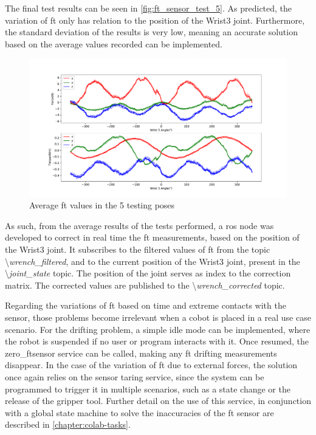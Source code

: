 \par The final test results can be seen in \autoref{fig:ft_sensor_test_5}. As predicted, the variation of \ac{ft} only has relation to the position of the Wrist3 joint. Furthermore, the standard deviation of the results is very low, meaning an accurate solution based on the average values recorded can be implemented.

\begin{figure}[h]
    \centering
    \includegraphics[width=\linewidth]{figs/chp3/ft_sensor_test_5.pdf}
    \caption{Average \ac{ft} values in the 5 testing poses}
    \label{fig:ft_sensor_test_5}
\end{figure}


\par As such, from the average results of the tests performed, a \ac{ros} node was developed to correct in real time the \ac{ft} measurements, based on the position of the Wrist3 joint. It subscribes to the filtered values of \ac{ft} from the topic \textbackslash \textit{wrench\_filtered}, and to the current position of the Wrist3 joint, present in the \textbackslash \textit{joint\_state} topic. The position of the joint serves as index to the correction matrix. The corrected values are published to the \textbackslash \textit{wrench\_corrected} topic.

\par Regarding the variations of \ac{ft} based on time and extreme contacts with the sensor, those problems become irrelevant when a cobot is placed in a real use case scenario. For the drifting problem, a simple idle mode can be implemented, where the robot is suspended if no user or program interacts with it. Once resumed, the zero\_ftsensor service can be called, making any \ac{ft} drifting measurements disappear. In the case of the variation of \ac{ft} due to external forces, the solution once again relies on the sensor taring service, since the system can be programmed to trigger it in multiple scenarios, such as a state change or the release of the gripper tool. Further detail on the use of this service, in conjunction with a global state machine to solve the inaccuracies of the \ac{ft} sensor are described in \autoref{chapter:colab-tasks}.

